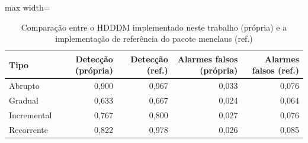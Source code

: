 \begin{table}[htbp]
\centering
\small
\caption{Comparação entre o HDDDM implementado neste trabalho (própria) e a implementação de referência do pacote menelaus (ref.)}
\label{tab:validacao-hdddm}
\begin{adjustbox}{max width=\textwidth}
\begin{tabular}{lrrrr}
\toprule
Tipo & Detecção (própria) & Detecção (ref.) & Alarmes falsos (própria) & Alarmes falsos (ref.) \\
\midrule
Abrupto & 0,900 & 0,967 & 0,033 & 0,076 \\
Gradual & 0,633 & 0,667 & 0,024 & 0,064 \\
Incremental & 0,767 & 0,800 & 0,027 & 0,076 \\
Recorrente & 0,822 & 0,978 & 0,026 & 0,085 \\
\bottomrule
\end{tabular}
\end{adjustbox}
\par\vspace{2pt}{\footnotesize Detecção: fração das transições detectadas; falsos alarmes: por bloco, antes do drift. Concordância bloco a bloco: 0,906.}
\end{table}
